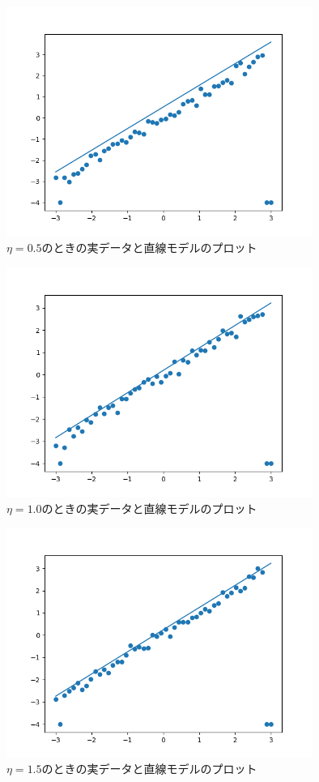 \documentclass[class=jsarticle, crop=false, dvipdfmx, fleqn]{standalone}
\begin{document}
\begin{figure}
	\centering
	\includegraphics[clip, width=10cm]{../figures/assignment3_result_eta5}
	\caption{\(\eta = 0.5\)のときの実データと直線モデルのプロット}
	\label{fig:eta5}
\end{figure}

\begin{figure}
	\centering
	\includegraphics[clip, width=10cm]{../figures/assignment3_result_eta10}
	\caption{\(\eta = 1.0\)のときの実データと直線モデルのプロット}
	\label{fig:eta10}
\end{figure}

\begin{figure}
	\centering
	\includegraphics[clip, width=10cm]{../figures/assignment3_result_eta15}
	\caption{\(\eta = 1.5\)のときの実データと直線モデルのプロット}
	\label{fig:eta15}
\end{figure}
\end{document}
